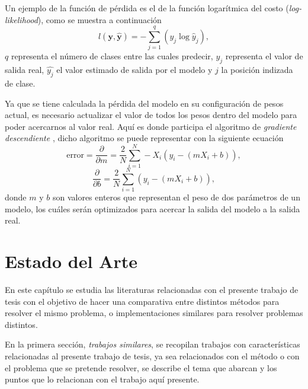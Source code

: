 Un ejemplo de la función de pérdida es el de la función logarítmica del costo (\emph{log-likelihood}), como se muestra a continuación
\begin{equation}
    l(\mathbf{y}, \hat{\mathbf{y}}) = - \sum_{j=1}^q (y_j \log \hat{y}_j),     
\end{equation}
$q$ representa el número de clases entre las cuales predecir, $y_j$ representa el valor de salida real, $\hat{y_j}$ el valor estimado de salida por el modelo y $j$ la posición indizada de clase.

Ya que se tiene calculada la pérdida del modelo en su configuración de pesos actual, es necesario actualizar el valor de todos los pesos dentro del modelo para poder acercarnos al valor real. Aquí es donde participa el algoritmo de \emph{gradiente descendiente} \citep{alg:gradient}, dicho algoritmo se puede representar con la siguiente ecuación
\begin{equation}
        \text{error} = \frac{\partial}{\partial m} = \frac{2}{N}\sum_{i=1}^{N}-X_i(y_i-(mX_i+b)),
\end{equation}
\begin{equation}
        \frac{\partial}{\partial b} = \frac{2}{N}\sum_{i=1}^{N}(y_i-(mX_i+b)),
\end{equation}
donde $m$ y $b$ son valores enteros que representan el peso de dos parámetros de un modelo, los cuáles serán optimizados para acercar la salida del modelo a la salida real.

%
%           


\chapter{Estado del Arte}
En este capítulo se estudia las literaturas relacionadas con el presente trabajo de tesis con el objetivo de hacer una comparativa entre distintos métodos para resolver el mismo problema, o implementaciones similares para resolver problemas distintos.

En la primera sección, \emph{trabajos similares}, se recopilan trabajos con características relacionadas al presente trabajo de tesis, ya sea relacionados con el método o con el problema que se pretende resolver, se describe el tema que abarcan y los puntos que lo relacionan con el trabajo aquí presente.

